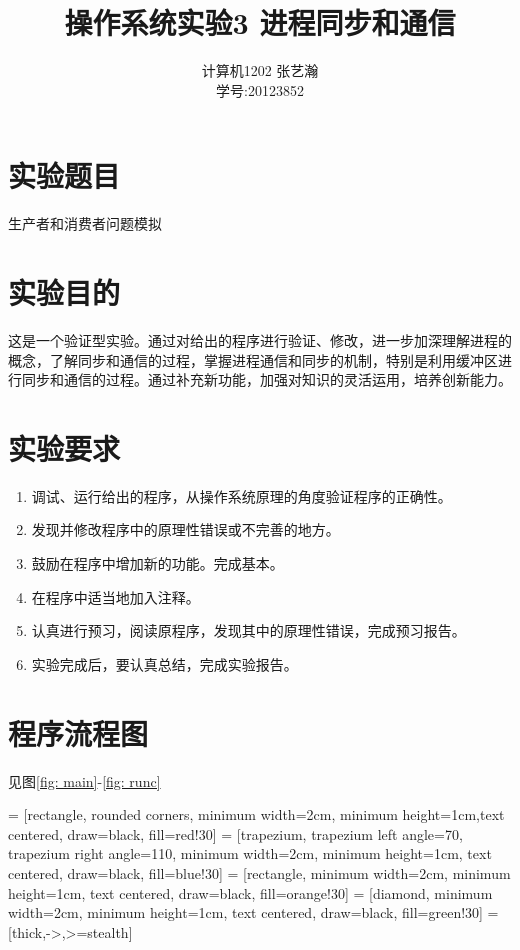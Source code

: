\documentclass[11pt]{article}
\begin{document}
\title{操作系统实验3 \quad 进程同步和通信}
\author{计算机1202 \quad 张艺瀚\\学号:20123852}
\maketitle

\thispagestyle{fancy}
\normalsize 

\section{实验题目}
生产者和消费者问题模拟

\section{实验目的}
这是一个验证型实验。通过对给出的程序进行验证、修改，进一步加深理解进程的概念，了解同步和通信的过程，掌握进程通信和同步的机制，特别是利用缓冲区进行同步和通信的过程。通过补充新功能，加强对知识的灵活运用，培养创新能力。

\section{实验要求}
\begin{enumerate}
  \item 调试、运行给出的程序，从操作系统原理的角度验证程序的正确性。
  \item 发现并修改程序中的原理性错误或不完善的地方。 
  \item 鼓励在程序中增加新的功能。完成基本。
  \item 在程序中适当地加入注释。
  \item 认真进行预习，阅读原程序，发现其中的原理性错误，完成预习报告。
  \item 实验完成后，要认真总结，完成实验报告。
\end{enumerate}

\section{程序流程图}
见图\ref{fig: main}-\ref{fig: runc}

 = [rectangle, rounded corners, minimum width=2cm, minimum height=1cm,text centered, draw=black, fill=red!30]
 = [trapezium, trapezium left angle=70, trapezium right angle=110, minimum width=2cm, minimum height=1cm, text centered, draw=black, fill=blue!30]
 = [rectangle, minimum width=2cm, minimum height=1cm, text centered, draw=black, fill=orange!30]
 = [diamond, minimum width=2cm, minimum height=1cm, text centered, draw=black, fill=green!30]
 = [thick,->,>=stealth]
\end{document}
